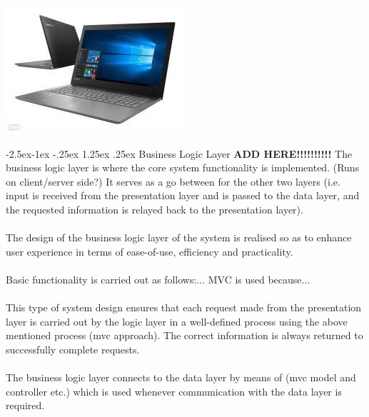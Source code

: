 \documentclass[paper=a4, fontsize=11pt]{scrartcl}
\makeatletter
\numberwithin{equation}{section}		%
\numberwithin{figure}{section}			%
\numberwithin{table}{section}				%
\renewcommand\paragraph{\@startsection{paragraph}{4}{\z@}%
            {-2.5ex\@plus -1ex \@minus -.25ex}%
            {1.25ex \@plus .25ex}%
            {\normalfont\normalsize\bfseries}}
\makeatother
\begin{document}
\newpage

\includegraphics[width = \textwidth]{img.jpeg}






\paragraph{Business Logic Layer}
\huge\textbf{ADD HERE!!!!!!!!!!}\normalsize
The business logic layer is where the core system functionality is implemented. (Runs on client/server side?) It serves as a go between for the other two layers (i.e. input is received from the presentation layer and is passed to the data layer, and the requested information is relayed back to the presentation layer).\\\\The design of the business logic layer of the system is realised so as to enhance user experience in terms of ease-of-use, efficiency and practicality.\\\\Basic functionality is carried out as follows:...
MVC is used because...\\\\This type of system design ensures that each request made from the presentation layer is carried out by the logic layer in a well-defined process using the above mentioned process (mvc approach). The correct information is always returned to successfully complete requests.\\\\The business logic layer connects to the data layer by means of (mvc model and controller etc.) which is used whenever communication with the data layer is required.
\end{document}
